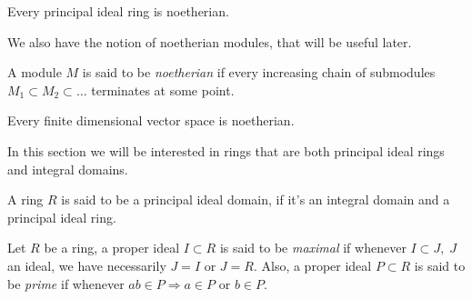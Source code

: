 \begin{dang}
    \begin{theorem}\label{principal_ideal_is_noetherian}\cite{hungerford2012algebra}
        Every principal ideal ring is noetherian.
    \end{theorem}
\end{dang}
We also have the notion of noetherian modules, that will be useful later.
\begin{dang}
    \begin{definition}\cite{curtis1966representation}
        A module $M$ is said to be \textit{noetherian} if every increasing chain of submodules $M_1\subset M_2\subset \dots$ terminates at some point.
    \end{definition}
\end{dang}
\begin{dang}
    \begin{example}
        Every finite dimensional vector space is noetherian.
    \end{example}
\end{dang}
In this section we will be interested in rings that are both principal ideal rings and integral domains.
\begin{dang}
    \begin{definition}\cite{curtis1966representation}
        A ring $R$ is said to be a principal ideal domain, if it's an integral domain and a principal ideal ring.
    \end{definition}
\end{dang}
\begin{dang}
    \begin{definition}
        Let $R$ be a ring, a proper ideal $I\subset R$ is said to be \textit{maximal} if whenever $I\subset J,\; J$ an ideal, we have necessarily $J=I$ or $J=R$. Also, a proper ideal $P\subset R$ is said to be \textit{prime} if whenever $ab\in P\Rightarrow a\in P$ or $b\in P$.
    \end{definition}
\end{dang}

